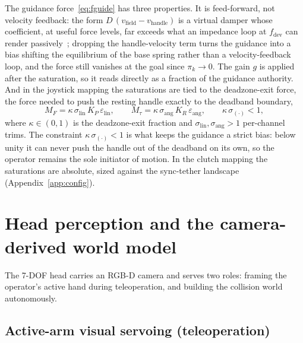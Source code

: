 The guidance force~\eqref{eq:fguide} has three properties. It is feed-forward, not velocity feedback: the form $D\,(v_{\text{field}} - v_{\text{handle}})$ is a virtual damper whose coefficient, at useful force levels, far exceeds what an impedance loop at $f_{\text{dev}}$ can render passively~\cite{colgate1994factors}; dropping the handle-velocity term turns the guidance into a bias shifting the equilibrium of the base spring rather than a velocity-feedback loop, and the force still vanishes at the goal since $\pi_k \to 0$. The gain $g$ is applied after the saturation, so it reads directly as a fraction of the guidance authority. And in the joystick mapping the saturations are tied to the deadzone-exit force, the force needed to push the resting handle exactly to the deadband boundary,
\begin{equation}
M_F = \kappa\,\sigma_{\text{lin}}\, K_P\, \varepsilon_{\text{lin}},
\qquad
M_\tau = \kappa\,\sigma_{\text{ang}}\, K_R\, \varepsilon_{\text{ang}},
\qquad
\kappa\,\sigma_{(\cdot)} < 1,
\label{eq:kappacal}
\end{equation}
where $\kappa \in (0,1)$ is the deadzone-exit fraction and $\sigma_{\text{lin}}, \sigma_{\text{ang}} > 1$ per-channel trims. The constraint $\kappa\,\sigma_{(\cdot)} < 1$ is what keeps the guidance a strict bias: below unity it can never push the handle out of the deadband on its own, so the operator remains the sole initiator of motion. In the clutch mapping the saturations are absolute, sized against the sync-tether landscape (Appendix~\ref{app:config}).

\section{Head perception and the camera-derived world model}
\label{sec:head}

The 7-DOF head carries an RGB-D camera and serves two roles: framing the operator's active hand during teleoperation, and building the collision world autonomously.

\subsection{Active-arm visual servoing (teleoperation)}
\label{sec:headtrack}

